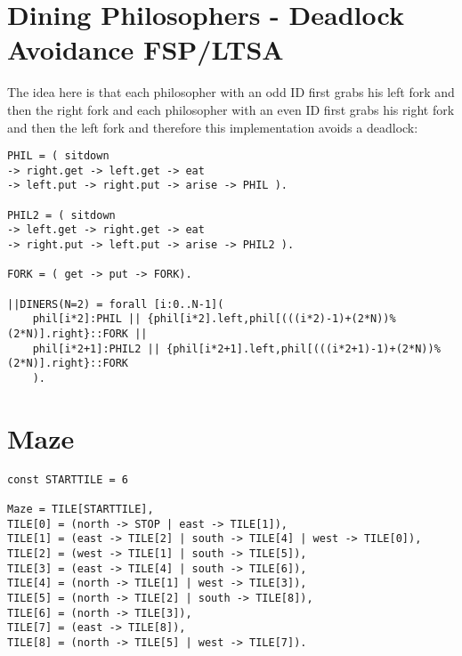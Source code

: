 \documentclass{report}
\begin{document}
	\section{Dining Philosophers - Deadlock Avoidance FSP/LTSA}
	\startsection
		The idea here is that each philosopher with an odd ID first grabs his left fork and then the right fork and each philosopher with an even ID first grabs his right fork and then the left fork and therefore this implementation avoids a deadlock:
		\begin{verbatim}
PHIL = ( sitdown
-> right.get -> left.get -> eat
-> left.put -> right.put -> arise -> PHIL ).

PHIL2 = ( sitdown
-> left.get -> right.get -> eat
-> right.put -> left.put -> arise -> PHIL2 ).

FORK = ( get -> put -> FORK).

||DINERS(N=2) = forall [i:0..N-1]( 
	phil[i*2]:PHIL || {phil[i*2].left,phil[(((i*2)-1)+(2*N))%(2*N)].right}::FORK || 
	phil[i*2+1]:PHIL2 || {phil[i*2+1].left,phil[(((i*2+1)-1)+(2*N))%(2*N)].right}::FORK 
	).
		\end{verbatim}
	\closesection
	
	\section{Maze}
	\startsection
		\begin{verbatim}
const STARTTILE = 6

Maze = TILE[STARTTILE],
TILE[0] = (north -> STOP | east -> TILE[1]),
TILE[1] = (east -> TILE[2] | south -> TILE[4] | west -> TILE[0]),
TILE[2] = (west -> TILE[1] | south -> TILE[5]),
TILE[3] = (east -> TILE[4] | south -> TILE[6]),
TILE[4] = (north -> TILE[1] | west -> TILE[3]),
TILE[5] = (north -> TILE[2] | south -> TILE[8]),
TILE[6] = (north -> TILE[3]),
TILE[7] = (east -> TILE[8]),
TILE[8] = (north -> TILE[5] | west -> TILE[7]).
		\end{verbatim}
	\closesection
\end{document}
